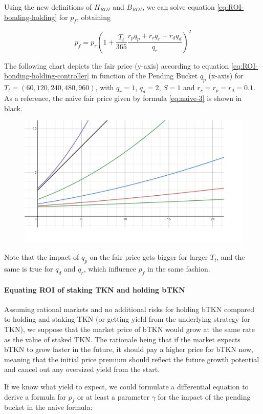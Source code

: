 \documentclass{article}
\begin{document}
Using the new definitions of $H_{ROI}$ and $B_{ROI}$, we can solve equation \ref{eq:ROI-bonding-holding} for $p_f$, obtaining

\begin{equation}
  \label{eq:ROI-bonding-holding-controller}
  p_f = p_r\left(1 + \frac{T_t}{365} \frac{r_p q_p + r_r q_r + r_d q_d}{q_r}\right)^2 
\end{equation}

The following chart depicts the fair price (y-axis) according to equation \ref{eq:ROI-bonding-holding-controller} in function of the Pending Bucket $q_p$ (x-axis) for $T_t=(60, 120, 240, 480, 960)$, with $q_r=1$, $q_d=2$, $S=1$ and $r_r=r_p=r_d=0.1$.
As a reference, the naive fair price given by formula \ref{eq:naive-3} is shown in black.

\begin{figure}
    \centering
    \includegraphics[width=0.5\linewidth]{./ChickenBonds_Whitepaper_controller_price.png}
\end{figure}

Note that the impact of $q_p$ on the fair price gets bigger for larger $T_t$, and the same is true for $q_d$ and $q_r$, which influence $p_f$ in the same fashion.

\paragraph{Equating ROI of staking TKN and holding bTKN}
Assuming rational markets and no additional risks for holding bTKN compared to holding and staking TKN (or getting yield from the underlying strategy for TKN), we suppose that the market price of bTKN would grow at the same rate as the value of staked TKN. The rationale being that if the market expects bTKN to grow faster in the future, it should pay a higher price for bTKN now, meaning that the initial price premium should reflect the future growth potential and cancel out any oversized yield from the start.

If we know what yield to expect, we could formulate a differential equation to derive a formula for $p_f$ or at least a parameter $\gamma$ for the impact of the pending bucket in the naive formula:
\end{document}
